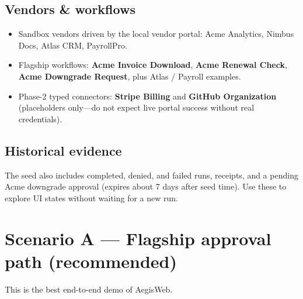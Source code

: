 \documentclass[11pt,a4paper]{article}
\newcommand{\ProductName}{AegisWeb}
\begin{document}
\subsection{Vendors \& workflows}
\begin{itemize}[leftmargin=1.2em]
  \item Sandbox vendors driven by the local vendor portal:
        Acme Analytics, Nimbus Docs, Atlas CRM, PayrollPro.
  \item Flagship workflows:
        \textbf{Acme Invoice Download},
        \textbf{Acme Renewal Check},
        \textbf{Acme Downgrade Request},
        plus Atlas / Payroll examples.
  \item Phase-2 typed connectors: \textbf{Stripe Billing} and
        \textbf{GitHub Organization} (placeholders only---do not expect live
        portal success without real credentials).
\end{itemize}

\subsection{Historical evidence}
The seed also includes completed, denied, and failed runs, receipts, and a
pending Acme downgrade approval (expires about 7 days after seed time). Use
these to explore UI states without waiting for a new run.

\newpage
\section{Scenario A --- Flagship approval path (recommended)}

This is the best end-to-end demo of \ProductName.
\end{document}
